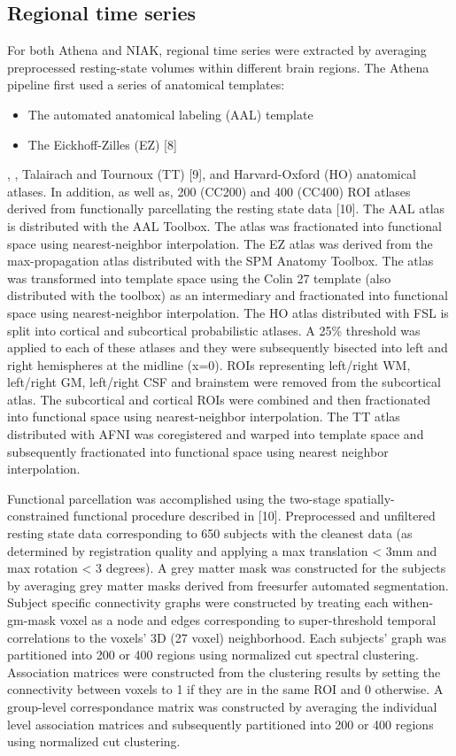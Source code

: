 \documentclass[preprint,12pt,1p]{elsarticle}
\begin{document}
\subsection{Regional time series}

For both Athena and NIAK, regional time series were extracted by averaging preprocessed resting-state volumes within different brain regions. The Athena pipeline first used a series of anatomical templates:
\begin{itemize}
\item The automated anatomical labeling (AAL) template \citep{Tzourio-Mazoyer} 
\item The Eickhoff-Zilles (EZ) [8]
\end{itemize}
, , Talairach and Tournoux (TT) [9], and Harvard-Oxford (HO) anatomical atlases. In addition,  as well as, 200 (CC200) and 400 (CC400) ROI atlases derived from functionally parcellating the resting state data [10]. The AAL atlas is distributed with the AAL Toolbox. The atlas was fractionated into functional space using nearest-neighbor interpolation.
The EZ atlas was derived from the max-propagation atlas distributed with the SPM Anatomy Toolbox. The atlas was transformed into template space using the Colin 27 template (also distributed with the toolbox) as an intermediary and fractionated into functional space using nearest-neighbor interpolation.
The HO atlas distributed with FSL is split into cortical and subcortical probabilistic atlases. A 25\% threshold was applied to each of these atlases and they were subsequently bisected into left and right hemispheres at the midline (x=0). ROIs representing left/right WM, left/right GM, left/right CSF and brainstem were removed from the subcortical atlas. The subcortical and cortical ROIs were combined and then fractionated into functional space using nearest-neighbor interpolation.
The TT atlas distributed with AFNI was coregistered and warped into template space and subsequently fractionated into functional space using nearest neighbor interpolation.
\par
Functional parcellation was accomplished using the two-stage spatially-constrained functional procedure described in [10]. Preprocessed and unfiltered resting state data corresponding to 650 subjects with the cleanest data (as determined by registration quality and applying a max translation < 3mm and max rotation < 3 degrees). A grey matter mask was constructed for the subjects by averaging grey matter masks derived from freesurfer automated segmentation. Subject specific connectivity graphs were constructed by treating each withen-gm-mask voxel as a node and edges corresponding to super-threshold temporal correlations to the voxels' 3D (27 voxel) neighborhood. Each subjects' graph was partitioned into 200 or 400 regions using normalized cut spectral clustering. Association matrices were constructed from the clustering results by setting the connectivity between voxels to 1 if they are in the same ROI and 0 otherwise. A group-level correspondance matrix was constructed by averaging the individual level association matrices and subsequently partitioned into 200 or 400 regions using normalized cut clustering.
\end{document}
